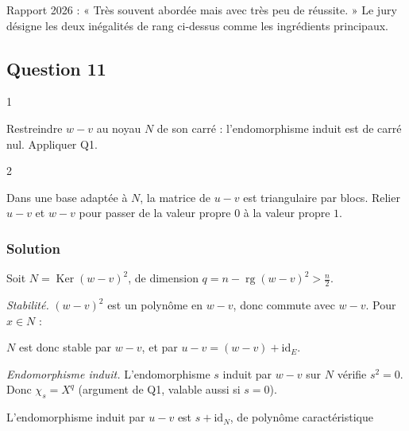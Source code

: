 \documentclass[11pt,a4paper]{article}
\newcommand{\equationajustee}[1]{%
  \sbox{\boiteequation}{$\displaystyle #1$}%
  \ifdim\wd\boiteequation>\linewidth
    \[\resizebox{\linewidth}{!}{\usebox{\boiteequation}}\]%
  \else
    \[#1\]%
  \fi}
\begin{document}
\begin{jury}

Rapport 2026 : « Très souvent abordée mais avec très peu de réussite. » Le jury désigne les deux inégalités de rang ci-dessus comme les ingrédients principaux.

\end{jury}

\hypertarget{question-11}{%
\subsection{Question 11}\label{question-11}}

\begin{indication}{1}

Restreindre \(w-v\) au noyau \(N\) de son carré : l'endomorphisme induit est de carré nul. Appliquer Q1.

\end{indication}

\begin{indication}{2}

Dans une base adaptée à \(N\), la matrice de \(u-v\) est triangulaire par blocs. Relier \(u-v\) et \(w-v\) pour passer de la valeur propre \(0\) à la valeur propre \(1\).

\end{indication}

\hypertarget{solution-10}{%
\subsubsection{Solution}\label{solution-10}}

Soit \(N=\operatorname{Ker}(w-v)^2\), de dimension \(q=n-\operatorname{rg}(w-v)^2>\frac n2\).

\emph{Stabilité.} \((w-v)^2\) est un polynôme en \(w-v\), donc commute avec \(w-v\). Pour \(x\in N\) :

\equationajustee{\begin{aligned}
(w-v)^2\big((w-v)(x)\big)&=(w-v)\big((w-v)^2(x)\big)\\
&=0.
\end{aligned}}

\(N\) est donc stable par \(w-v\), et par \(u-v=(w-v)+{\mathrm{id}}_E\).

\emph{Endomorphisme induit.} L'endomorphisme \(s\) induit par \(w-v\) sur \(N\) vérifie \(s^2=0\). Donc \(\chi_s=X^q\) (argument de Q1, valable aussi si \(s=0\)).

L'endomorphisme induit par \(u-v\) est \(s+{\mathrm{id}}_N\), de polynôme caractéristique
\end{document}
